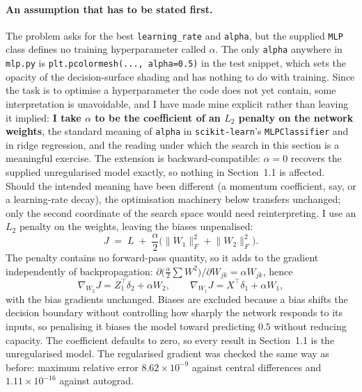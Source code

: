 \documentclass[11pt,a4paper]{article}
\newcommand{\code}[1]{\texttt{#1}}
\begin{document}
\paragraph{An assumption that has to be stated first.} The problem asks for the
best \code{learning\_rate} and \code{alpha}, but the supplied \code{MLP} class
defines no training hyperparameter called $\alpha$. The only \code{alpha} anywhere
in \code{mlp.py} is \code{plt.pcolormesh(..., alpha=0.5)} in the test snippet,
which sets the opacity of the decision-surface shading and has nothing to do with
training. Since the task is to optimise a hyperparameter the code does not yet
contain, some interpretation is unavoidable, and I have made mine explicit rather
than leaving it implied: \textbf{I take $\alpha$ to be the coefficient of an $L_2$
penalty on the network weights}, the standard meaning of \code{alpha} in
\code{scikit-learn}'s \code{MLPClassifier} and in ridge regression, and the
reading under which the search in this section is a meaningful exercise. The
extension is backward-compatible: $\alpha=0$ recovers the supplied unregularised
model exactly, so nothing in Section~1.1 is affected. Should the intended meaning
have been different (a momentum coefficient, say, or a learning-rate decay), the
optimisation machinery below transfers unchanged; only the second coordinate of the
search space would need reinterpreting. I use an $L_2$ penalty
on the weights, leaving the biases unpenalised:
\begin{equation}
J \;=\; L \;+\; \frac{\alpha}{2}
\Big(\lVert W_1\rVert_F^2+\lVert W_2\rVert_F^2\Big).
\end{equation}
The penalty contains no forward-pass quantity, so it adds to the gradient independently
of backpropagation:
$\partial\big(\tfrac{\alpha}{2}\sum W^2\big)/\partial W_{jk} = \alpha W_{jk}$,
hence
\begin{equation}
\nabla_{W_2}J = Z_1^{\top}\delta_2+\alpha W_2,
\qquad
\nabla_{W_1}J = X^{\top}\delta_1+\alpha W_1,
\end{equation}
with the bias gradients unchanged. Biases are excluded because a bias shifts the
decision boundary without controlling how sharply the network responds to its inputs,
so penalising it biases the model toward predicting $0.5$ without reducing capacity.
The coefficient defaults to zero, so every result in Section~1.1 is the unregularised
model. The regularised gradient was checked the same way as before: maximum relative
error $8.62\times 10^{-9}$ against central differences
and $1.11\times 10^{-16}$ against autograd.
\end{document}
